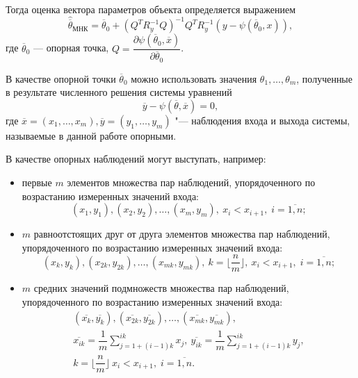 Тогда оценка вектора параметров объекта определяется выражением
\begin{equation}
  \label{eq:nonlinear_lse_estimate}
  \hat{\overline{\theta}}_{\text{МНК}} =
  \overline{\theta}_0 + (Q^T R^{-1}_{y} Q)^{-1} Q^T R^{-1}_{y} (y - \psi(\overline{\theta}_0, x)),
\end{equation}
где \( \overline{\theta}_0 \) --- опорная точка,
\( Q = \dfrac{\partial \psi(\overline{\theta}_0, \overline{x}) }{ \partial \overline{\theta}_0 } \).

В качестве опорной точки \( \overline{\theta}_0 \) можно использовать значения
\( \theta_1, \dotsc, \theta_m \),
полученные в результате численного решения системы уравнений
\begin{equation}
  \label{eq:nonlinear_basic}
  \overline{y} - \psi( \overline{\theta}, \overline{x} ) = 0,
\end{equation}
где \( \overline{x} = (x_1, \ldots, x_m), \overline{y} = (y_1, \ldots, y_m) \)
"--- наблюдения входа и выхода системы, называемые в данной работе опорными.

В качестве опорных наблюдений могут выступать, например:
\begin{itemize}
\item первые \( m \) элементов множества пар наблюдений,
  упорядоченного по возрастанию измеренных значений входа:
  \[
    (x_1, y_1), (x_2, y_2), \dotsc , (x_m, y_m), \:
    x_i < x_{i+1}, \;
    i = \overline{1, n};
  \]
\item \( m \) равноотстоящих друг от друга элементов множества пар наблюдений,
  упорядоченного по возрастанию измеренных значений входа:
  \[
    (x_{k}, y_{k}), (x_{2k}, y_{2k}) , \dotsc , (x_{mk}, y_{mk}), \:
    k = \lfloor \dfrac{n}{m} \rfloor, \:
    x_i < x_{i+1}, \;
    i = \overline{1, n};
  \]
\item \( m \) средних значений подмножеств множества пар наблюдений,
  упорядоченного по возрастанию измеренных значений входа:
  \begin{equation}
    \begin{gathered}
      ( \overline{x_{k}}, \overline{y_{k}} ),
      ( \overline{x_{2k}}, \overline{y_{2k}} ),
      \dotsc ,
      ( \overline{x_{mk}}, \overline{y_{mk}}), \\
      \overline{x_{ik}} = \dfrac{1}{m} \sum_{j = 1+(i-1)k}^{ik} x_j, \:
      \overline{y_{ik}} = \dfrac{1}{m} \sum_{j = 1+(i-1)k}^{ik} y_j, \\
      k = \lfloor \dfrac{n}{m} \rfloor \:
      x_i < x_{i+1}, \; i = \overline{1, n}.
    \end{gathered}
    \label{eq:nonlinear_base_values}
  \end{equation}
\end{itemize}

